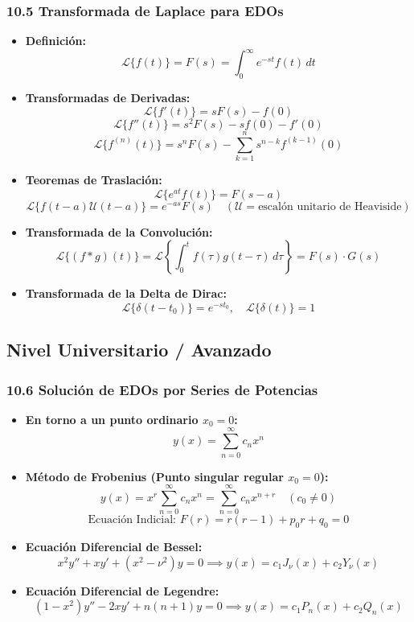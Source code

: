 \documentclass[11pt,a4paper]{article}
\begin{document}
\subsubsection*{10.5 Transformada de Laplace para EDOs}

\begin{itemize}
  \item \textbf{Definición:}
  \[
    \mathcal{L}\{f(t)\} = F(s) = \int_0^\infty e^{-st} f(t) \, dt
  \]
  \item \textbf{Transformadas de Derivadas:}
  \[
    \mathcal{L}\{f'(t)\} = s F(s) - f(0)
  \]
  \[
    \mathcal{L}\{f''(t)\} = s^2 F(s) - s f(0) - f'(0)
  \]
  \[
    \mathcal{L}\{f^{(n)}(t)\} = s^n F(s) - \sum_{k=1}^n s^{n - k} f^{(k - 1)}(0)
  \]
  \item \textbf{Teoremas de Traslación:}
  \[
    \mathcal{L}\{e^{at} f(t)\} = F(s - a)
  \]
  \[
    \mathcal{L}\{f(t - a)\mathcal{U}(t - a)\} = e^{-as} F(s) \quad (\mathcal{U} = \text{escalón unitario de Heaviside})
  \]
  \item \textbf{Transformada de la Convolución:}
  \[
    \mathcal{L}\{(f * g)(t)\} = \mathcal{L}\left\{ \int_0^t f(\tau)g(t - \tau) \, d\tau \right\} = F(s) \cdot G(s)
  \]
  \item \textbf{Transformada de la Delta de Dirac:}
  \[
    \mathcal{L}\{\delta(t - t_0)\} = e^{-s t_0}, \quad \mathcal{L}\{\delta(t)\} = 1
  \]
\end{itemize}

\subsection*{Nivel Universitario / Avanzado}

\subsubsection*{10.6 Solución de EDOs por Series de Potencias}

\begin{itemize}
  \item \textbf{En torno a un punto ordinario $x_0 = 0$:}
  \[
    y(x) = \sum_{n=0}^\infty c_n x^n
  \]
  \item \textbf{Método de Frobenius (Punto singular regular $x_0 = 0$):}
  \[
    y(x) = x^r \sum_{n=0}^\infty c_n x^n = \sum_{n=0}^\infty c_n x^{n + r} \quad (c_0 \ne 0)
  \]
  \[
    \text{Ecuación Indicial: } F(r) = r(r - 1) + p_0 r + q_0 = 0
  \]
  \item \textbf{Ecuación Diferencial de Bessel:}
  \[
    x^2 y'' + x y' + (x^2 - \nu^2)y = 0 \implies y(x) = c_1 J_\nu(x) + c_2 Y_\nu(x)
  \]
  \item \textbf{Ecuación Diferencial de Legendre:}
  \[
    (1 - x^2)y'' - 2x y' + n(n + 1)y = 0 \implies y(x) = c_1 P_n(x) + c_2 Q_n(x)
  \]
\end{itemize}
\end{document}
